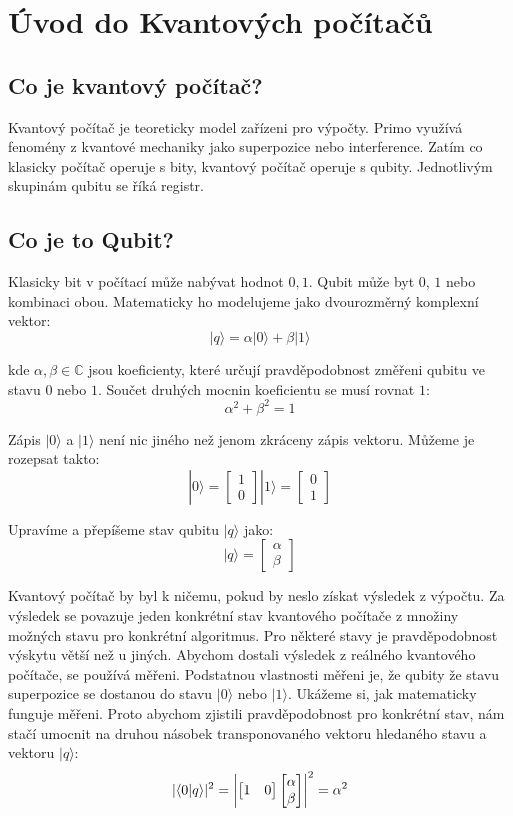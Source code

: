 \documentclass[11pt]{article}
\DeclarePairedDelimiter{\abs}{\lvert}{\rvert}
\begin{document}
\newpage

\section{Úvod do Kvantových počítačů}
\subsection{Co je kvantový počítač?}
Kvantový počítač je teoreticky model zařízeni pro výpočty.
Primo využívá fenomény z kvantové mechaniky jako superpozice nebo interference.
Zatím co klasicky počítač operuje s bity, kvantový počítač operuje s qubity.
Jednotlivým skupinám qubitu se říká registr.

\subsection{Co je to Qubit?}
Klasicky bit v počítací může nabývat hodnot ${0, 1}$.
Qubit může byt $0$, $1$ nebo kombinaci obou.
Matematicky ho modelujeme jako dvourozměrný komplexní vektor:
$$|q\rangle = \alpha|0\rangle + \beta|1\rangle$$
\par kde $\alpha,\beta\in\mathbb{C}$ jsou koeficienty, které určují pravděpodobnost změřeni qubitu ve stavu $0$ nebo $1$.
Součet druhých mocnin koeficientu se musí rovnat $1$:
$$\alpha^2 + \beta^2 = 1$$
\par Zápis $|0\rangle$ a $|1\rangle$ není nic jiného než jenom zkráceny zápis vektoru.
Můžeme je rozepsat takto:
$$|0\rangle = \begin{bmatrix}
        1 \\
        0
    \end{bmatrix} |1\rangle = \begin{bmatrix}
        0 \\
        1
    \end{bmatrix}  $$
\par Upravíme a přepíšeme stav qubitu $|q\rangle$ jako:
$$|q\rangle = \begin{bmatrix}
        \alpha \\
        \beta
    \end{bmatrix}$$

\par Kvantový počítač by byl k ničemu, pokud by neslo získat výsledek z výpočtu.
Za výsledek se povazuje jeden konkrétní stav kvantového počítače z množiny možných stavu pro konkrétní algoritmus.
Pro některé stavy je pravděpodobnost výskytu větší než u jiných.
Abychom dostali výsledek z reálného kvantového počítače, se používá měřeni.
Podstatnou vlastnosti měřeni je, že qubity že stavu superpozice se dostanou do stavu $|0\rangle$ nebo $|1\rangle$.
Ukážeme si, jak matematicky funguje měřeni.
Proto abychom zjistili pravděpodobnost pro konkrétní stav, nám stačí umocnit na druhou násobek transponovaného vektoru hledaného stavu a vektoru $|q\rangle$:
$$|\langle 0 | q \rangle|^2 = \abs*{\begin{bmatrix}
            1 & 0
        \end{bmatrix}\begin{bmatrix}
            \alpha \\
            \beta
        \end{bmatrix}}^2 = \alpha ^ 2$$
\end{document}
